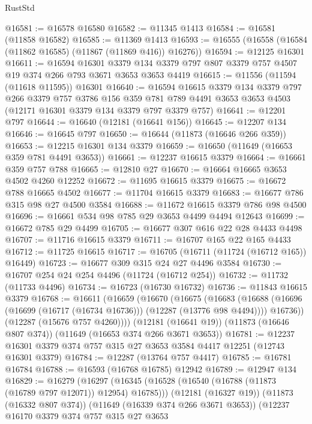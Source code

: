\begin{lexlean}{RustStd}
\begin{coremodule}
@16581 := @16578 @16580
@16582 := @11345 @1413
@16584 := @16581 (@11858 @16582)
@16585 := @11369 @1413
@16593 := @16555 (@16558 (@16584 (@11862 @16585) (@11867 (@11869 @416)) @16276))
@16594 := @12125 @16301
@16611 := @16594
    @16301
    @3379
    @134
    @3379
    @797
    @807
    @3379
    @757
    @4507
    @19
    @374
    @266
    @793
    @3671
    @3653
    @3653
    @4419
@16615 := @11556 (@11594 (@11618 @11595)) @16301
@16640 := @16594
    @16615
    @3379
    @134
    @3379
    @797
    @266
    @3379
    @757
    @3786
    @156
    @359
    @781
    @789
    @4491
    @3653
    @3653
    @4503
    (@12171 @16301 @3379 @134 @3379 @797 @3379 @757)
@16641 := @12201 @797
@16644 := @16640 (@12181 (@16641 @156))
@16645 := @12207 @134
@16646 := @16645 @797
@16650 := @16644 (@11873 (@16646 @266 @359))
@16653 := @12215 @16301 @134 @3379
@16659 := @16650 (@11649 (@16653 @359 @781 @4491 @3653))
@16661 := @12237 @16615 @3379
@16664 := @16661 @359 @757 @788
@16665 := @12810 @27
@16670 := @16664 @16665 @3653 @4502 @4260 @12252
@16672 := @11695 @16615 @3379
@16675 := @16672 @788 @16665 @4502
@16677 := @11704 @16615 @3379
@16683 := @16677 @786 @315 @98 @27 @4500 @3584
@16688 := @11672 @16615 @3379 @786 @98 @4500
@16696 := @16661 @534 @98 @785 @29 @3653 @4499 @4494 @12643
@16699 := @16672 @785 @29 @4499
@16705 := @16677 @307 @616 @22 @28 @4433 @4498
@16707 := @11716 @16615 @3379
@16711 := @16707 @165 @22 @165 @4433
@16712 := @11725 @16615
@16717 := @16705 (@16711 (@11724 (@16712 @165)) @16449)
@16723 := @16677 @309 @315 @24 @27 @4496 @3584
@16730 := @16707 @254 @24 @254 @4496 (@11724 (@16712 @254))
@16732 := @11732 (@11733 @4496)
@16734 := @16723 (@16730 @16732)
@16736 := @11843 @16615 @3379
@16768 := @16611
    (@16659
      (@16670
        (@16675
          (@16683
            (@16688 (@16696 (@16699 (@16717 (@16734 @16736))) (@12287 (@13776 @98 @4494))))
            @16736))
        (@12287 (@15676 @757 @4260))))
    (@12181 (@16641 @19))
    (@11873 (@16646 @807 @374))
    (@11649 (@16653 @374 @266 @3671 @3653))
@16781 := @12237 @16301 @3379 @374 @757 @315 @27 @3653 @3584 @4417 @12251 (@12743 @16301 @3379)
@16784 := @12287 (@13764 @757 @4417)
@16785 := @16781 @16784
@16788 := @16593 (@16768 @16785) @12942
@16789 := @12947 @134
@16829 := @16279
    (@16297
      (@16345 (@16528 (@16540 (@16788 (@11873 (@16789 @797 @12071)) @12954) @16785)))
      (@12181 (@16327 @19))
      (@11873 (@16332 @807 @374))
      (@11649 (@16339 @374 @266 @3671 @3653))
      (@12237
        @16170
        @3379
        @374
        @757
        @315
        @27
        @3653

\end{coremodule}
\end{lexlean}
